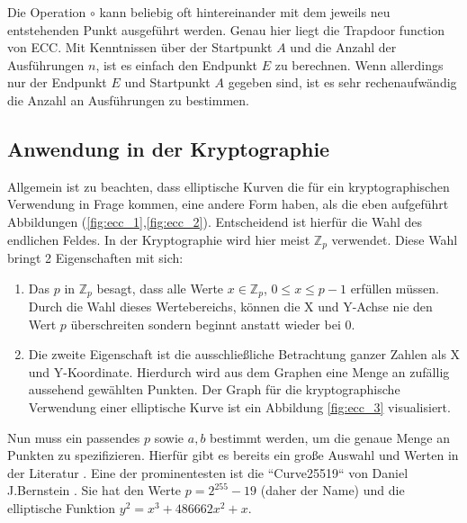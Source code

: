 \documentclass[11pt,a4paper]{scrreprt}
\begin{document}
Die Operation $\circ$ kann beliebig oft hintereinander mit dem jeweils neu entstehenden Punkt ausgeführt werden. Genau hier liegt die Trapdoor function von ECC. Mit Kenntnissen über der Startpunkt $A$ und die Anzahl der Ausführungen $n$, ist es einfach den Endpunkt $E$ zu berechnen. Wenn allerdings nur der Endpunkt $E$ und Startpunkt $A$ gegeben sind, ist es sehr rechenaufwändig die Anzahl an Ausführungen zu bestimmen.

\subsection{Anwendung in der Kryptographie}
Allgemein ist zu beachten, dass elliptische Kurven die für ein kryptographischen Verwendung in Frage kommen, eine andere Form haben, als die eben aufgeführt Abbildungen (\ref{fig:ecc_1},\ref{fig:ecc_2}). Entscheidend ist hierfür die Wahl des endlichen Feldes. In der Kryptographie wird hier meist $\mathbb{Z}_p$ verwendet. Diese Wahl bringt 2 Eigenschaften mit sich:
\begin{enumerate}
    \item Das $p$ in $\mathbb{Z}_p$ besagt, dass alle Werte $x \in \mathbb{Z}_p$, $0 \leq x \leq p-1$ erfüllen müssen. Durch die Wahl dieses Wertebereichs, können die X und Y-Achse nie den Wert $p$ überschreiten sondern beginnt anstatt wieder bei 0.
    \item Die zweite Eigenschaft ist die ausschließliche Betrachtung ganzer Zahlen als X und Y-Koordinate. Hierdurch wird aus dem Graphen eine Menge an zufällig aussehend gewählten Punkten. Der Graph für die kryptographische Verwendung einer elliptische Kurve ist ein Abbildung \ref{fig:ecc_3} visualisiert.
\end{enumerate}
Nun muss ein passendes $p$ sowie $a,b$ bestimmt werden, um die genaue Menge an Punkten zu spezifizieren. Hierfür gibt es bereits ein große Auswahl und Werten in der Literatur \cite{ecc-lochter2010elliptic}\cite{ecc-merkle2013elliptic}. Eine der prominentesten ist die ``Curve25519`` von Daniel J.Bernstein \cite{ecc-bernstein2006curve25519}. Sie hat den Werte $p=2^{255}-19$ (daher der Name) und die elliptische Funktion  $y^2=x^3+486662x^2+x$.
\end{document}
